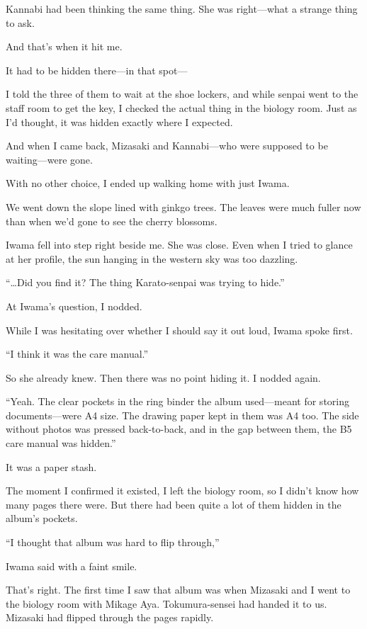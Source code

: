 \documentclass[
    a4paper,
    12pt,
    twoside,
    openany,
    UTF8,
    fontset=windows
]{ctexbook}
\begin{document}
Kannabi had been thinking the same thing. She was right---what a strange thing to ask.

And that's when it hit me.

It had to be hidden there---in that spot---

I told the three of them to wait at the shoe lockers, and while senpai went to the staff room to get the key, I checked the actual thing in the biology room. Just as I'd thought, it was hidden exactly where I expected.

And when I came back, Mizasaki and Kannabi---who were supposed to be waiting---were gone.

With no other choice, I ended up walking home with just Iwama.

We went down the slope lined with ginkgo trees. The leaves were much fuller now than when we'd gone to see the cherry blossoms.

Iwama fell into step right beside me. She was close. Even when I tried to glance at her profile, the sun hanging in the western sky was too dazzling.

``\dots Did you find it? The thing Karato-senpai was trying to hide.''

At Iwama's question, I nodded.

While I was hesitating over whether I should say it out loud, Iwama spoke first.

``I think it was the care manual.''

So she already knew. Then there was no point hiding it. I nodded again.

``Yeah. The clear pockets in the ring binder the album used---meant for storing documents---were A4 size. The drawing paper kept in them was A4 too. The side without photos was pressed back-to-back, and in the gap between them, the B5 care manual was hidden.''

It was a paper stash.

The moment I confirmed it existed, I left the biology room, so I didn't know how many pages there were. But there had been quite a lot of them hidden in the album's pockets.

``I thought that album was hard to flip through,''

Iwama said with a faint smile.

That's right. The first time I saw that album was when Mizasaki and I went to the biology room with Mikage Aya. Tokumura-sensei had handed it to us. Mizasaki had flipped through the pages rapidly.
\end{document}
